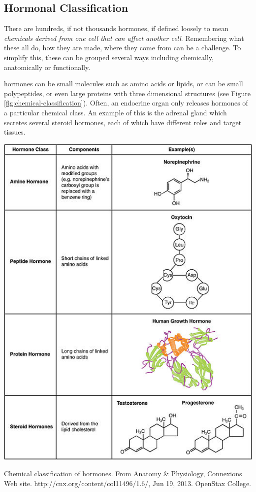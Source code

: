 \documentclass{tufte-handout}
\begin{document}
\subsection{Hormonal Classification}

There are hundreds, if not thousands hormones, if defined loosely to mean \emph{chemicals derived from one cell that can affect another cell}.  Remembering what these all do, how they are made, where they come from can be a challenge.  To simplify this, these can be grouped several ways including chemically, anatomically or functionally.  

 hormones can be small molecules such as amino acids or lipids, or can be small polypeptides, or even large proteins with three dimensional structures (see Figure \ref{fig:chemical-classification}).  Often, an endocrine organ only releases hormones of a particular chemical class.  An example of this is the adrenal gland which secretes several steroid hormones, each of which have different roles and target tissues.

\begin{marginfigure}
  \includegraphics{figures/hormone-classification}
  \caption{Chemical classification of hormones.  From Anatomy \& Physiology, Connexions Web site. http://cnx.org/content/col11496/1.6/, Jun 19, 2013. OpenStax College.}
    \label{fig:chemical-classification}
\end{marginfigure}
\end{document}

